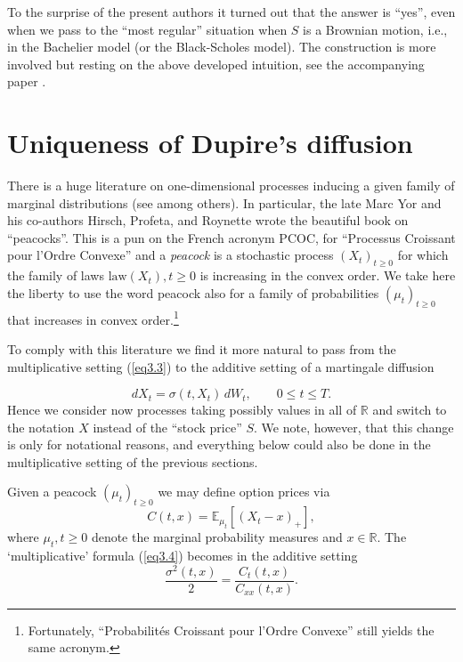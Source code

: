 \documentclass[11pt,a4paper]{article}%
\def\E{{\mathbb E}}
\def\R{{\mathbb R}}
\numberwithin{equation}{section}
\begin{document}
 To the surprise of the present authors it turned out that the answer is ``yes'', even when we pass to the ``most regular'' situation when $S$ is a Brownian motion, i.e., in the Bachelier model (or the Black-Scholes model). The construction is more involved but resting on the above developed intuition, see the accompanying paper \cite{BePaSc21a}. %



\section{Uniqueness of Dupire's diffusion}

There is a huge literature on one-dimensional processes inducing a given family of marginal distributions (see \cite{Ke72, MaYo02, HiRo12, HiRoYo14, BeHuSt16, Lo08b, HaKl07, FaHaKl15, Ho13, Ol08, Al08, BaDoYo11, KaTaTo15} among others). In particular, the late Marc Yor and his co-authors Hirsch, Profeta, and Roynette wrote the beautiful book \cite{HiPrRoYo11} on ``peacocks''.
  This is a  pun on the French acronym PCOC, for ``Processus Croissant pour l'Ordre Convexe'' and a \emph{peacock} is a stochastic process $(X_t)_{t\geq 0}$ for which the family of laws $ \text{law}(X_t), t\geq 0$ is increasing in the convex order. We take here the liberty to use the word peacock also for a family of probabilities $(\mu_t)_{t\geq 0}$ that increases in convex order.\footnote{Fortunately, ``Probabilit\'es Croissant pour l'Ordre Convexe'' still yields the same acronym.}

 To comply with this literature we find it more natural to pass from the multiplicative setting (\ref{eq3.3}) to the additive setting of a martingale diffusion

\begin{equation}\label{eq3.3add}
{dX_t}=\sigma(t,X_t)\, dW_t,\qquad 0\le t \le T.
\end{equation}
Hence we consider now processes taking possibly values in all of $\R$ and switch to the notation $X$ instead of the ``stock price'' $S$. We note, however, that this change is only for notational reasons, and everything below could also be done in the multiplicative setting of the previous sections.

Given a peacock $(\mu_t)_{t\geq 0}$ we may define option prices via
\begin{equation} \label{eq3.1ad}
C(t,x) = \E_{\mu_t}[(X_t-x)_+],
\end{equation}
where $\mu_t, t\geq 0$ denote the marginal probability measures and $x \in \R$. The `multiplicative' formula (\ref{eq3.4}) becomes in the additive setting
\begin{equation}\label{eq3.4add}
 \frac{\sigma^2(t,x)}{2} =  \frac{C_t(t,x)}{ C_{xx}(t,x)} .
\end{equation}
\end{document}

